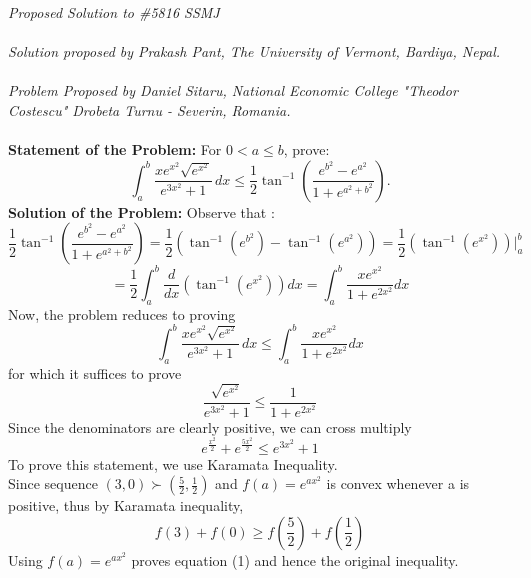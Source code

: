 \documentclass[12pt]{article}
\begin{document}
\textit{Proposed Solution to \#5816 SSMJ }\\ \\
\textit{Solution proposed by Prakash Pant, The University of Vermont, Bardiya, Nepal.}\\ \\
\textit{Problem Proposed by Daniel Sitaru, National Economic College "Theodor Costescu"
Drobeta Turnu - Severin, Romania.
} \\ \\
\textbf{Statement of the Problem:}
For \(0 < a \le b \), prove:\\

\[
\int_{a}^{b} \frac{x e^{x^2} \sqrt{e^{x^2}}}{e^{3x^2} + 1} \, dx
\le
\frac{1}{2} \tan^{-1}\!\left(
\frac{e^{b^2} - e^{a^2}}{1 + e^{a^2 + b^2}}
\right).
\]
\textbf{Solution of the Problem:}
Observe that : 
\[ \frac{1}{2} \tan^{-1}\!\left(
\frac{e^{b^2} - e^{a^2}}{1 + e^{a^2 + b^2}}
\right) = \frac{1}{2} \left( \tan^{-1}(e^{b^2}) - \tan^{-1}(e^{a^2}) \right) = \frac{1}{2} ( \tan^{-1}(e^{x^2})) |_a^b \]
\[  =\frac{1}{2} \int_a^b \frac{d}{dx}(\tan^{-1}(e^{x^2})) dx  =  \int_a^b \frac{xe^{x^2}}{1+e^{2x^2}} dx  \]
Now, the problem reduces to proving 
\[
\int_{a}^{b} \frac{x e^{x^2} \sqrt{e^{x^2}}}{e^{3x^2} + 1} \, dx
\le
 \int_a^b \frac{xe^{x^2}}{1+e^{2x^2}} dx 
\]
for which it suffices to prove
\[ \frac{\sqrt{e^{x^2}}}{e^{3x^2}+1} \le \frac{1}{1+e^{2x^2}} \]
Since the denominators are clearly positive, we can cross multiply
\begin{equation} e^{\frac{x^2}{2}} + e^{\frac{5x^2}{2}} \le e^{3x^2}+1
\end{equation}
To prove this statement, we use Karamata Inequality.\\ Since sequence \( (3,0) \succ (\frac{5}{2},\frac{1}{2})\) and \( f(a) = e^{ax^2}\) is convex whenever a is positive, thus by Karamata inequality, 
\[ f(3) + f(0) \ge f(\frac{5}{2}) + f(\frac{1}{2})\]
Using \( f(a) = e^{ax^2}\) proves equation (1) and hence the original inequality. 
\end{document}
